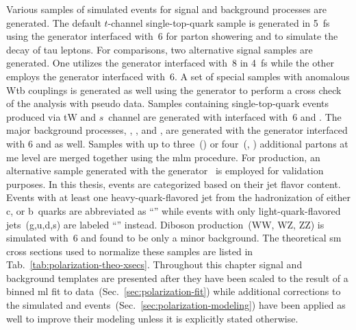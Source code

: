 
Various samples of simulated events for signal and background processes are generated. The default $t$-channel single-top-quark sample is generated in 5~\gls{fs} using the \POWHEG generator interfaced with \PYTHIA{}\,6 for parton showering and \TAUOLA to simulate the decay of tau leptons. For comparisons, two alternative signal samples are generated. One utilizes the \AMC generator interfaced with \PYTHIA{}\,8 in 4~\gls{fs} while the other employs the \COMPHEP generator interfaced with \PYTHIA{}\,6. A set of special samples with anomalous Wtb couplings is generated as well using the \COMPHEP generator to perform a cross check of the analysis with pseudo data. Samples containing single-top-quark events produced via tW and $s$~channel are generated with \POWHEG interfaced with \PYTHIA{}\,6 and \TAUOLA. The major background processes, \wjets, \zjets, and \ttbar, are generated with the \MG generator interfaced with \PYTHIA{}6 and \TAUOLA as well. Samples with up to three~(\ttbar) or four~(\wjets, \zjets) additional partons at \gls{me} level are merged together using the \gls{mlm} procedure. For \wjets production, an alternative sample generated with the \SHERPA[format=hyperbf] generator~\cite{Hoeche:2012ft} is employed for validation purposes. In this thesis, \wjets events are categorized based on their jet flavor content. Events with at least one heavy-quark-flavored jet from the hadronization of either c, or b~quarks are abbreviated as ``'' while events with only light-quark-flavored jets~(g,u,d,s) are labeled ``'' instead. Diboson production~(WW, WZ, ZZ) is simulated with \PYTHIA{}\,6 and found to be only a minor background. The theoretical \gls{sm} cross sections used to normalize these samples are listed in Tab.~\ref{tab:polarization-theo-xsecs}. Throughout this chapter signal and background templates are presented after they have been scaled to the result of a binned \gls{ml} fit to data~(Sec.~\ref{sec:polarization-fit}) while additional corrections to the simulated \wjets and \ttbar events~(Sec.~\ref{sec:polarization-modeling}) have been applied as well to improve their modeling unless it is explicitly stated otherwise.

